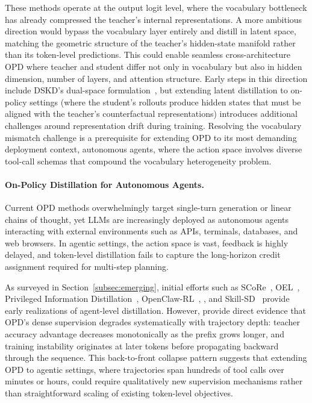 \documentclass{article} %
\begin{document}
These methods operate at the output logit level, where the vocabulary bottleneck has already compressed the teacher's internal representations. A more ambitious direction would bypass the vocabulary layer entirely and distill in latent space, matching the geometric structure of the teacher's hidden-state manifold rather than its token-level predictions. This could enable seamless cross-architecture OPD where teacher and student differ not only in vocabulary but also in hidden dimension, number of layers, and attention structure. Early steps in this direction include DSKD's dual-space formulation~\citep{2504.11426}, but extending latent distillation to on-policy settings (where the student's rollouts produce hidden states that must be aligned with the teacher's counterfactual representations) introduces additional challenges around representation drift during training. Resolving the vocabulary mismatch challenge is a prerequisite for extending OPD to its most demanding deployment context, autonomous agents, where the action space involves diverse tool-call schemas that compound the vocabulary heterogeneity problem.

\paragraph{On-Policy Distillation for Autonomous Agents.}
Current OPD methods overwhelmingly target single-turn generation or linear chains of thought, yet LLMs are increasingly deployed as autonomous agents interacting with external environments such as APIs, terminals, databases, and web browsers. In agentic settings, the action space is vast, feedback is highly delayed, and token-level distillation fails to capture the long-horizon credit assignment required for multi-step planning.

As surveyed in Section~\ref{subsec:emerging}, initial efforts such as SCoRe~\citep{2509.14257}, OEL~\citep{2603.16856}, Privileged Information Distillation~\citep{2602.04942}, OpenClaw-RL~\citep{wang2026openclawrl}, \citet{afsharrad2026onpolicy}, and Skill-SD~\citep{wang2026skillsd} provide early realizations of agent-level distillation. However, \citet{li2026rethinking} provide direct evidence that OPD's dense supervision degrades systematically with trajectory depth: teacher accuracy advantage decreases monotonically as the prefix grows longer, and training instability originates at later tokens before propagating backward through the sequence. This back-to-front collapse pattern suggests that extending OPD to agentic settings, where trajectories span hundreds of tool calls over minutes or hours, could require qualitatively new supervision mechanisms rather than straightforward scaling of existing token-level objectives.
\end{document}

